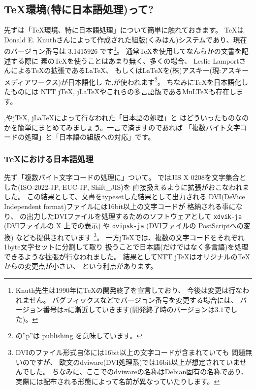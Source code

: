 \documentclass[mingoth,a4paper]{jsarticle}
\begin{document}
\subsection{{\TeX}環境(特に日本語処理)って?}
\label{subsec:history}


先ずは「{\TeX}環境、特に日本語処理」について簡単に触れておきます。
%
{\TeX}はDonald E. Knuthさんによって作成された組版(くみはん)システムであり、現在のバージョン番号は 3.1415926 です\footnote{%
  Knuth先生は1990年に{\TeX}の開発終了を宣言しており、
  今後は変更は行なわれません。
  バグフィックスなどでバージョン番号を変更する場合には、
  バージョン番号は$\pi$に漸近していきます(開発終了時のバージョンは$3.1$でした)。
}。
%
通常{\TeX}を使用してなんらかの文書を記述する際に
素の{\TeX}を使うことはあまり無く、多くの場合、
Leslie Lamportさんによる{\TeX}の拡張である{\LaTeX}、
もしくは{\LaTeX}を(株)アスキー(現:アスキーメディアワークス)が日本語化し
た{\pTeX},{\pLaTeX}が使われます\footnote{%
  {\pLaTeX}の''p''は publishing を意味しています。
}。
ちなみに{\TeX}を日本語化したものには
NTT j{\TeX}, j{\LaTeX}やこれらの多言語版である{MuL\TeX}も存在します。

{\pTeX},{\pLaTeX}やj{\TeX}, j{\LaTeX}によって行なわれた「日本語の処理」と
はどういったものなのかを簡単にまとめてみましょう。一言で済ますのであれば
「複数バイト文字コードの処理」と「日本語の組版への対応」です。

\subsubsection{{\TeX}における日本語処理}

先ず「複数バイト文字コードの処理に」ついて。
%
{\pTeX}ではJIS X 0208を文字集合とした(ISO-2022-JP, EUC-JP, Shift\_JIS)を
直接扱えるように拡張がおこなわれました。
この結果として、{\pLaTeX}文書をtypesetした結果として出力される
DVI(DeVice Independent format)ファイルには16bit以上の文字コードが
格納される事になり、
{\pTeX}の出力したDVIファイルを処理するためのソフトウェアとして
{\tt{xdvik-ja}} (DVIファイルの X 上での表示) や
{\tt{dvipsk-ja}} (DVIファイルの PostScriptへの変換) なども提供されています
\footnote{%
  DVIのファイル形式自体には16bit以上の文字コードが含まれていても
  問題無いのですが、
  欧文のdviware(DVI処理系)では16bit以上が想定されていませんでした。
  ちなみに、ここでのdviwareの名称はDebian固有の名称であり、
  実際には配布される形態によって名前が異なっていたりします。
}。
%
一方j{\TeX}では、複数の文字コードをそれぞれ1byte文字セットに分割して取り
扱うことで日本語(だけではなく多言語)を処理できるような拡張が行なわれました。
結果としてNTT j{\TeX}はオリジナルの{\TeX}からの変更点が小さい、
という利点があります。
\end{document}
